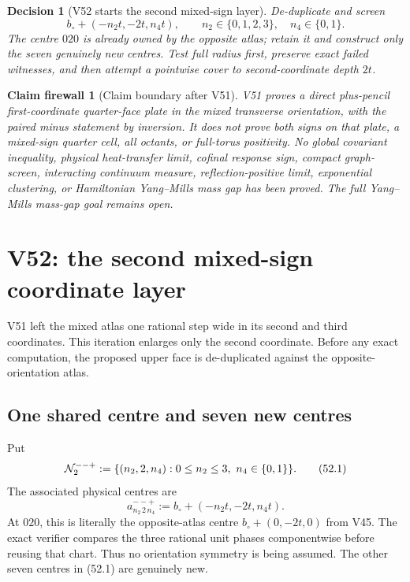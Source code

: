 \documentclass[11pt,oneside]{article}
\newtheorem{firewall}[theorem]{Claim firewall}
\newtheorem{decision}[theorem]{Decision}
\theoremstyle{definition}
\theoremstyle{remark}
\begin{document}
\begin{decision}[V52 starts the second mixed-sign layer]
\label{dec:newv51-next}
De-duplicate and screen
\[
 b_\circ+(-n_2t,-2t,n_4t),
 \qquad n_2\in\{0,1,2,3\},\quad n_4\in\{0,1\}.         \tag{51.12}
\]
The centre \(020\) is already owned by the opposite atlas; retain
it and construct only the seven genuinely new centres.  Test full
radius first, preserve exact failed witnesses, and then attempt a
pointwise cover to second-coordinate depth \(2t\).
\end{decision}

\begin{firewall}[Claim boundary after V51]
\label{fire:newv51-final}
V51 proves a direct plus-pencil first-coordinate quarter-face plate
in the mixed transverse orientation, with the paired minus
statement by inversion.  It does not prove both signs on that
plate, a mixed-sign quarter cell, all octants, or full-torus
positivity.  No global covariant inequality, physical heat-transfer
limit, cofinal response sign, compact graph-screen, interacting
continuum measure, reflection-positive limit, exponential
clustering, or Hamiltonian Yang--Mills mass gap has been proved.
The full Yang--Mills mass-gap goal remains open.
\end{firewall}

\section{V52: the second mixed-sign coordinate layer}
\label{sec:newv52-mixed-second-layer}

V51 left the mixed atlas one rational step wide in its second and
third coordinates.  This iteration enlarges only the second
coordinate.  Before any exact computation, the proposed upper
face is de-duplicated against the opposite-orientation atlas.

\subsection{One shared centre and seven new centres}

Put
\[
 {\cal N}_{2}^{--+}:=
 \{(n_2,2,n_4):0\le n_2\le3,\ n_4\in\{0,1\}\}.        \tag{52.1}
\]
The associated physical centres are
\[
 a_{n_2\,2\,n_4}^{--+}
 :=b_\circ+(-n_2t,-2t,n_4t).                         \tag{52.2}
\]
At \(020\), this is literally the opposite-atlas centre
\(b_\circ+(0,-2t,0)\) from V45.  The exact verifier compares the
three rational unit phases componentwise before reusing that
chart.  Thus no orientation symmetry is being assumed.  The other
seven centres in (52.1) are genuinely new.
\end{document}
